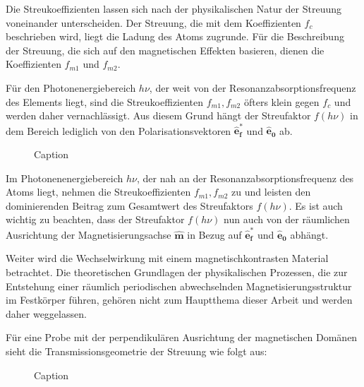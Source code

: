 \noindent
Die Streukoeffizienten lassen sich nach der physikalischen Natur der Streuung voneinander unterscheiden. Der Streuung, die mit dem Koeffizienten $f_c$ beschrieben wird, liegt die Ladung des Atoms zugrunde. Für die Beschreibung der Streuung, die sich auf den magnetischen Effekten basieren, dienen die Koeffizienten $f_{m1}$ und $f_{m2}$.


\noindent
Für den Photonenergiebereich $h\nu$, der weit von der Resonanzabsorptionsfrequenz des Elements liegt, sind die Streukoeffizienten  $f_{m1}, f_{m2}$ öfters klein gegen $f_c$ und werden daher vernachlässigt. Aus diesem Grund hängt der Streufaktor $f(h\nu)$ in dem Bereich lediglich von den Polarisationsvektoren $\mathbf{\hat{e}_f^*}$ und $\mathbf{\hat{e}_0}$ ab.
\begin{figure}[h]
    \centering
    
    \caption{Caption}
    \label{fig:my_label}
\end{figure}

\noindent
Im Photonenenergiebereich $h\nu$, der nah an der Resonanzabsorptionsfrequenz des Atoms liegt, nehmen die Streukoeffizienten $f_{m1}, f_{m2}$ zu und leisten den dominierenden Beitrag zum Gesamtwert des Streufaktors $f(h\nu)$. Es ist auch wichtig zu beachten, dass der Streufaktor $f(h\nu)$ nun auch von der räumlichen Ausrichtung der Magnetisierungsachse $\mathbf{\hat{m}}$ in Bezug auf $\mathbf{\hat{e}_f^*}$ und $\mathbf{\hat{e}_0}$ abhängt.


\noindent
Weiter wird die Wechselwirkung mit einem magnetischkontrasten Material betrachtet. Die theoretischen Grundlagen der physikalischen Prozessen, die zur Entstehung einer räumlich periodischen abwechselnden Magnetisierungsstruktur im Festkörper führen, gehören nicht zum Hauptthema dieser Arbeit und werden daher weggelassen.  

\noindent
Für eine Probe mit der perpendikulären Ausrichtung der magnetischen Domänen sieht die Transmissionsgeometrie der Streuung wie folgt aus:
\begin{figure}[h]
    \centering
    
    \caption{Caption}
    \label{fig:my_label}
\end{figure}


